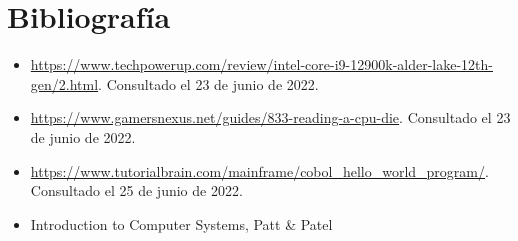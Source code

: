 \documentclass[a4paper, titlepage]{report}
\begin{document}
	\chapter{Bibliografía} %
	
	\begin{itemize}
		\item \url{https://www.techpowerup.com/review/intel-core-i9-12900k-alder-lake-12th-gen/2.html}. Consultado el 23 de junio de 2022.
		\item \url{https://www.gamersnexus.net/guides/833-reading-a-cpu-die}. Consultado el 23 de junio de 2022.
		\item \url{https://www.tutorialbrain.com/mainframe/cobol_hello_world_program/}. Consultado el 25 de junio de 2022.
		\item Introduction to Computer Systems, Patt \& Patel %
	\end{itemize}
	
\end{document}
